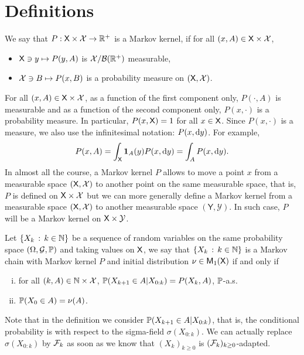 \documentclass[english,graybox,envcountchap,envcountsame,sectrefs,shortlabels]{svmono}
\theoremstyle{style}
\newcommand{\Yset}{\mathsf{Y}}
\newcommand{\Ysigma}{\mathcal{Y}}
\newcommand{\bs}{\begin{shaded}}
\newcommand{\es}{\end{shaded}}
\newcommand{\eqsp}{}
\begin{document}
\section{Definitions}

\begin{definition}
We say that $P:\mathsf{X}\times\mathcal{X}\to\mathbb{R}^{+}$
is a Markov kernel, if for all $(x,A)\in\mathsf{X}\times\mathcal{X}$,
\begin{itemize}
\item $\mathsf{X}\ni y\mapsto P(y,A)$ is $\mathcal{X}/\mathcal{B}(\mathbb{R}^{+})$ measurable,
\item $\mathcal{X}\ni B\mapsto P(x,B)$ is a probability measure on $(\mathsf{X},\mathcal{X})$.
\end{itemize}
\end{definition}
For all $(x,A)\in\mathsf{X}\times\mathcal{X}$, as a function
of the first component only, $P(\cdot,A)$ is measurable and as a
function of the second component only, $P(x,\cdot)$ is a probability
measure. In particular, $P(x,\mathsf{X})=1$ for all $x\in\mathsf{X}$. Since
$P(x,\cdot)$ is a measure, we also use the infinitesimal notation:
$P(x,\mathrm{d} y)$. For example, 
$$
P(x,A)=\int_{\Xset}\indi A(y)P(x,\rmd y)=\int_{A}P(x,\rmd y)\eqsp.
$$
In almost all the course, a Markov kernel $P$ allows to move a point $x$ from a measurable space $(\mathsf{X},\mathcal{X})$ to another point on the same measurable space, that is, $P$ is defined on $\mathsf{X}\times \mathcal{X}$ but we can more generally define a Markov kernel from a measurable space $(\mathsf{X},\mathcal{X})$ to another measurable space $(\Yset,\Ysigma)$. In such case, $P$ will be a  Markov kernel on $\Xset \times \Ysigma$. 
\begin{definition}
\label{def:MarkovChain} Let $\left\{ X_{k}\,:\,k\in\mathbb{N}\right\}$
be a sequence of random variables on the same probability space $(\Omega,\mathcal{G},\mathbb{P})$
and taking values on $\mathsf{X}$, we say that $\left\{ X_{k}\,:\,k\in\mathbb{N}\right\}$
is a Markov chain with Markov kernel $P$ and initial distribution
$\nu\in\mathsf{M}_{1}(\mathsf{X})$ if and only if
\begin{enumerate}[(i)]
\item  for all $(k,A)\in\mathbb{N}\times\mathcal{X}$,  $\mathbb{P}(X_{k+1}\in A|X_{0:k})=P(X_{k},A)$,
$\mathbb{P}$-a.s.
\item $\mathbb{P}(X_{0}\in A)=\nu(A)$.
\end{enumerate}
\end{definition}
Note that in the definition we consider $\mathbb{P}(X_{k+1}\in A|X_{0:k})$,
that is, the conditional probability is with respect to the sigma-field
$\sigma(X_{0:k})$. We can actually replace $\sigma(X_{0:k})$ by
$\mathcal{F}_{k}$ as soon as we know that $(X_{k})_{k\geq0}$ is $(\mathcal{F}_{k})_{k\geq0}$-adapted.
\end{document}
